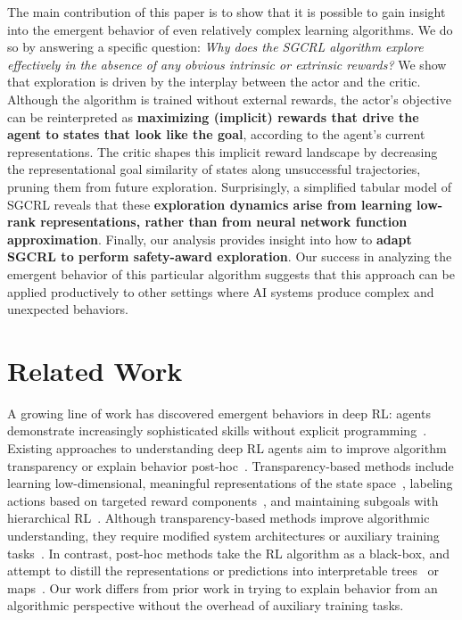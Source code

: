 \documentclass{article}
\begin{document}
The main contribution of this paper is to show that it is possible to gain insight into the emergent behavior of even relatively complex learning algorithms. We do so by answering a specific question:  \textit{Why does the SGCRL algorithm explore effectively in the absence of any obvious intrinsic or extrinsic rewards?} We show that exploration is driven by the interplay between the actor and the critic. Although the algorithm is trained without external rewards, the actor's objective can be reinterpreted as \textbf{maximizing (implicit) rewards that drive the agent to states that look like the goal}, according to the agent's current representations. The critic shapes this implicit reward landscape by decreasing the representational goal similarity of states along unsuccessful trajectories, pruning them from future exploration. Surprisingly, a simplified tabular model of SGCRL reveals that these \textbf{exploration dynamics arise from learning low-rank representations, rather than from neural network function approximation}. Finally, our analysis provides insight into how to \textbf{adapt SGCRL to perform safety-award exploration}. Our success in analyzing the emergent behavior of this particular algorithm suggests that this approach can be applied productively to other settings where AI systems produce complex and unexpected behaviors.
















\section{Related Work}

A growing line of work has discovered emergent behaviors in deep RL: agents demonstrate increasingly sophisticated skills without explicit programming~\citep{liu2025a,bush2025interpreting,simmons2025deep,team2021open}.
Existing approaches to understanding deep RL agents aim to improve algorithm transparency or explain behavior post-hoc~\citep{heuillet2021explainability,glanois2024survey}. Transparency-based methods include learning low-dimensional, meaningful representations of the state space~\citep{lesort2018state,lesort2019deep,raffin2019decoupling}, labeling actions based on targeted reward components~\citep{juozapaitis2019explainable}, and maintaining subgoals with hierarchical RL~\citep{beyret2019dot, cideron2020higher}. 
Although transparency-based methods improve algorithmic understanding, they require modified system architectures or auxiliary training tasks~\citep{beyret2019dot,juozapaitis2019explainable}. In contrast, post-hoc methods take the RL algorithm as a black-box, and attempt to distill the representations or predictions into interpretable trees~\citep{bewley2021tripletree, coppens2019distilling} or maps~\citep{greydanus2018visualizing, zahavy2016graying}. Our work differs from prior work in trying to explain behavior from an algorithmic perspective without the overhead of auxiliary training tasks.
\end{document}
